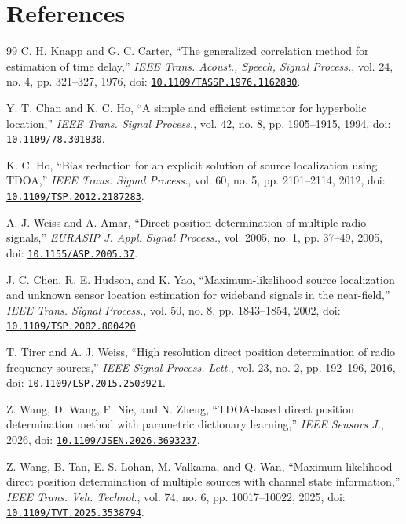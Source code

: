 \documentclass[11pt,a4paper]{article}
\numberwithin{equation}{section}
\numberwithin{figure}{section}
\numberwithin{table}{section}
\begin{document}
\section{References}\label{sec:5}
\begin{thebibliography}{99}
\small
{}C. H. Knapp and G. C. Carter, ``The generalized correlation method for estimation of time delay,'' \emph{IEEE Trans. Acoust., Speech, Signal Process.}, vol. 24, no. 4, pp. 321--327, 1976, doi: \href{https://doi.org/10.1109/TASSP.1976.1162830}{\nolinkurl{10.1109/TASSP.1976.1162830}}.

Y. T. Chan and K. C. Ho, ``A simple and efficient estimator for hyperbolic location,'' \emph{IEEE Trans. Signal Process.}, vol. 42, no. 8, pp. 1905--1915, 1994, doi: \href{https://doi.org/10.1109/78.301830}{\nolinkurl{10.1109/78.301830}}.

K. C. Ho, ``Bias reduction for an explicit solution of source localization using TDOA,'' \emph{IEEE Trans. Signal Process.}, vol. 60, no. 5, pp. 2101--2114, 2012, doi: \href{https://doi.org/10.1109/TSP.2012.2187283}{\nolinkurl{10.1109/TSP.2012.2187283}}.

A. J. Weiss and A. Amar, ``Direct position determination of multiple radio signals,'' \emph{EURASIP J. Appl. Signal Process.}, vol. 2005, no. 1, pp. 37--49, 2005, doi: \href{https://doi.org/10.1155/ASP.2005.37}{\nolinkurl{10.1155/ASP.2005.37}}.

J. C. Chen, R. E. Hudson, and K. Yao, ``Maximum-likelihood source localization and unknown sensor location estimation for wideband signals in the near-field,'' \emph{IEEE Trans. Signal Process.}, vol. 50, no. 8, pp. 1843--1854, 2002, doi: \href{https://doi.org/10.1109/TSP.2002.800420}{\nolinkurl{10.1109/TSP.2002.800420}}.

T. Tirer and A. J. Weiss, ``High resolution direct position determination of radio frequency sources,'' \emph{IEEE Signal Process. Lett.}, vol. 23, no. 2, pp. 192--196, 2016, doi: \href{https://doi.org/10.1109/LSP.2015.2503921}{\nolinkurl{10.1109/LSP.2015.2503921}}.

 Z. Wang, D. Wang, F. Nie, and N. Zheng, ``TDOA-based direct position determination method with parametric dictionary learning,'' \emph{IEEE Sensors J.}, 2026, doi: \href{https://doi.org/10.1109/JSEN.2026.3693237}{\nolinkurl{10.1109/JSEN.2026.3693237}}.

 Z. Wang, B. Tan, E.-S. Lohan, M. Valkama, and Q. Wan, ``Maximum likelihood direct position determination of multiple sources with channel state information,'' \emph{IEEE Trans. Veh. Technol.}, vol. 74, no. 6, pp. 10017--10022, 2025, doi: \href{https://doi.org/10.1109/TVT.2025.3538794}{\nolinkurl{10.1109/TVT.2025.3538794}}.


\end{thebibliography}
\end{document}
